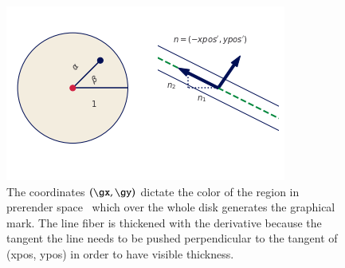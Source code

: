 \documentclass[journal]{vgtc}                %
\begin{document}
\begin{figure}
  \centering
  \includegraphics[width=\columnwidth]{base_q}
  \caption{The coordinates $(\gx, \gy)$ dictate the color of the region in prerender space \gbase\, which over the whole disk generates the graphical mark. The line fiber is thickened with the derivative because the tangent the line needs to be pushed perpendicular to the tangent of (xpos, ypos) in order to have visible thickness.}
  \label{fig:math:artist:base}
\end{figure}
\end{document}
